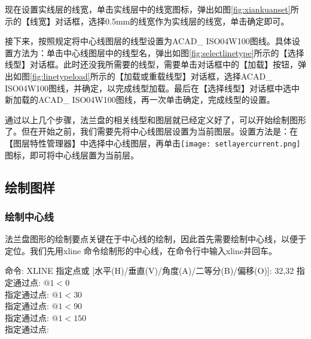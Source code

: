 \begin{figure}[htbp]
\centering
\begin{floatrow}
\end{floatrow}
\end{figure}
现在设置实线层的线宽，单击实线层中的线宽图标，弹出如图\ref{fig:xiankuanset}所示的【线宽】对话框，选择0.5mm的线宽作为实线层的线宽，单击确定即可。

接下来，按照规定将中心线图层的线型设置为ACAD\_ ISO04W100图线。具体设置方法为：单击中心线图层中的线型名，弹出如图\ref{fig:selectlinetype}所示的【选择线型】对话框。此时还没我所需要的线型，需要单击对话框中的【加载】按钮，弹出如图\ref{fig:linetypeload}所示的【加载或重载线型】对话框，选择ACAD\_ ISO04W100图线，并确定，以完成线型加载。最后在【选择线型】对话框中选中新加载的ACAD\_ ISO04W100图线，再一次单击确定，完成线型的设置。
\begin{figure}[htbp]
\centering
\begin{floatrow}
\end{floatrow}
\end{figure}

通过以上几个步骤，法兰盘的相关线型和图层就已经定义好了，可以开始绘制图形了。但在开始之前，我们需要先将中心线图层设置为当前图层。设置方法是：在【图层特性管理器】中选择中心线图层，再单击\texttt{[image: setlayercurrent.png]}图标，即可将中心线层置为当前层。
\subsection{绘制图样}
\subsubsection{绘制中心线}
法兰盘图形的绘制要点关键在于中心线的绘制，因此首先需要绘制中心线，以便于定位。我们先用xline 命令绘制形的中心线，在命令行中输入xline并回车。

\noindent
命令: XLINE 指定点或 [水平(H)/垂直(V)/角度(A)/二等分(B)/偏移(O)]: 32,32
指定通过点: $@1<0$\\
指定通过点: $@1<30$\\
指定通过点: $@1<90$\\
指定通过点: $@1<150$\\
指定通过点:\\
\indent

